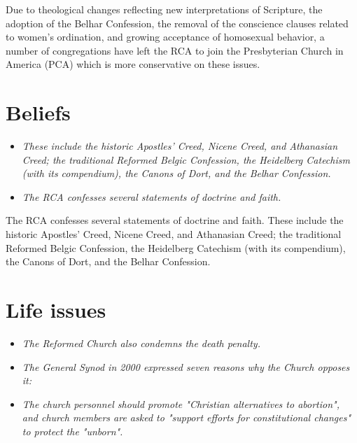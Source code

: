 Due to theological changes reflecting new interpretations of Scripture,
the adoption of the Belhar Confession, the removal of the conscience
clauses related to women's ordination, and growing acceptance of
homosexual behavior, a number of congregations have left the RCA to join
the Presbyterian Church in America (PCA) which is more conservative on
these issues.

\section{Beliefs}\label{beliefs}

\begin{itemize}
\item
  \emph{These include the historic Apostles' Creed, Nicene Creed, and
  Athanasian Creed; the traditional Reformed Belgic Confession, the
  Heidelberg Catechism (with its compendium), the Canons of Dort, and
  the Belhar Confession.}
\item
  \emph{The RCA confesses several statements of doctrine and faith.}
\end{itemize}

The RCA confesses several statements of doctrine and faith. These
include the historic Apostles' Creed, Nicene Creed, and Athanasian
Creed; the traditional Reformed Belgic Confession, the Heidelberg
Catechism (with its compendium), the Canons of Dort, and the Belhar
Confession.

\section{Life issues}\label{life-issues}

\begin{itemize}
\item
  \emph{The Reformed Church also condemns the death penalty.}
\item
  \emph{The General Synod in 2000 expressed seven reasons why the Church
  opposes it:}
\item
  \emph{The church personnel should promote "Christian alternatives to
  abortion", and church members are asked to "support efforts for
  constitutional changes" to protect the "unborn".}
\end{itemize}

